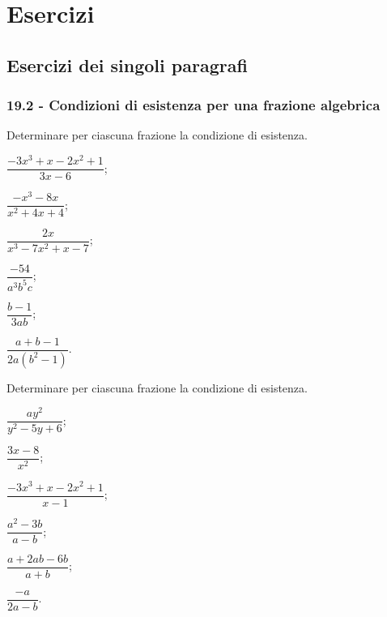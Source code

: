 
\section{Esercizi}
\subsection{Esercizi dei singoli paragrafi}
\subsubsection*{19.2 - Condizioni di esistenza per una frazione algebrica}

\begin{esercizio}
\label{ese:19.1}
Determinare per ciascuna frazione la condizione di esistenza.
\begin{multicols}{3}
\begin{enumeratea}
 \item $\dfrac{-3x^{3}+x-2x^{2}+1}{3x-6}$;
 \item $\dfrac{-x^{3}-8x}{x^{2}+4x+4}$;
 \item $\dfrac{2x}{x^{3}-7x^{2}+x-7}$;
 \item $\dfrac{-54}{a^{3}b^{5}c}$;
 \item $\dfrac{b-1}{3ab}$;
 \item $\dfrac{a+b-1}{2a \left(b^{2}-1\right)}$.
\end{enumeratea}
\end{multicols}
\end{esercizio}

\begin{esercizio}
\label{ese:19.2}
Determinare per ciascuna frazione la condizione di esistenza.
\begin{multicols}{3}
\begin{enumeratea}
 \item $\dfrac{ay^{2}}{y^{2}-5y+6}$;
 \item $\dfrac{3x-8}{x^{2}}$;
 \item $\dfrac{-3x^{3}+x-2x^{2}+1}{x-1}$;
 \item $\dfrac{a^{{2}}-3b}{a-b}$;
 \item $\dfrac{a+2ab-6b}{a+b}$;
 \item $\dfrac{-a}{2a-b}$.
\end{enumeratea}
\end{multicols}
\end{esercizio}


